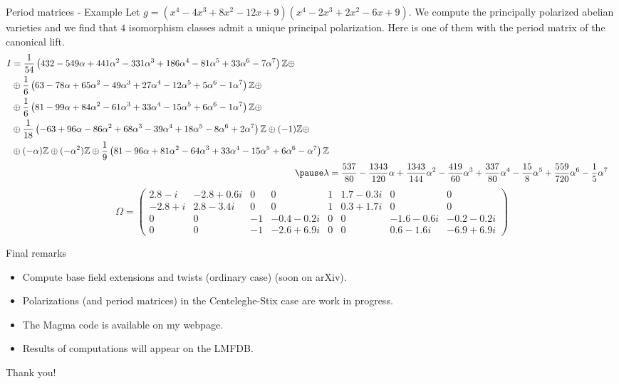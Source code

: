 \documentclass[usenames,dvipsnames]{beamer}
\def\Z{\mathbb{Z}}
\begin{document}
    
\begin{frame}{ Period matrices - Example }
   Let $g=(x^4 - 4x^3 + 8x^2 - 12x + 9)(x^4 - 2x^3 + 2x^2 - 6x + 9)$.
   \pause We compute the principally polarized abelian varieties and we find that $4$ isomorphism classes admit a unique principal polarization.
   \pause Here is one of them with the period matrix of the canonical lift.
 {\scriptsize\begin{align*}
    \begin{split}
       I & =  \dfrac{1}{54}\left(432-549\alpha+441\alpha^2-331\alpha^3+186\alpha^4-81\alpha^5+33\alpha^6-7\alpha^7\right)\Z\oplus\\
	   & \oplus\dfrac{1}{6}\left(63-78\alpha+65\alpha^2-49\alpha^3+27\alpha^4-12\alpha^5+5\alpha^6-1\alpha^7\right)\Z\oplus\\
           & \oplus\dfrac{1}{6}\left(81-99\alpha+84\alpha^2-61\alpha^3+33\alpha^4-15\alpha^5+6\alpha^6-1\alpha^7\right)\Z\oplus\\
           & \oplus\dfrac{1}{18}\left(-63+96\alpha-86\alpha^2+68\alpha^3-39\alpha^4+18\alpha^5-8\alpha^6+2\alpha^7\right)\Z\oplus(-1)\Z\oplus\\
	   & \oplus(-\alpha)\Z\oplus(-\alpha^2)\Z\oplus\dfrac{1}{9}\left(81-96\alpha+81\alpha^2-64\alpha^3+33\alpha^4-15\alpha^5+6\alpha^6-\alpha^7\right)\Z
    \end{split}\\
    \pause \lambda & = \dfrac{537}{80} -\dfrac{1343}{120}\alpha +\dfrac{1343}{144}\alpha^2 -\dfrac{419}{60}\alpha^3 +\dfrac{337}{80}\alpha^4 -\dfrac{15}{8}\alpha^5 +\dfrac{559}{720}\alpha^6 -\dfrac{1}{5}\alpha^7
    \end{align*}}
    \pause
    {\scriptsize\[
    \Omega =
    \begin{pmatrix}
      2.8 - i & -2.8 + 0.6i & 0 & 0 & 1 & 1.7 - 0.3i & 0 & 0 \\
      -2.8 + i & 2.8 - 3.4i & 0 & 0 & 1 & 0.3 + 1.7i & 0 & 0 \\
      0 & 0 & -1 & -0.4 - 0.2i & 0 & 0 & -1.6 - 0.6i & -0.2 - 0.2i\\
      0 & 0 & -1 & -2.6 + 6.9i & 0 & 0 & 0.6 - 1.6i & -6.9 + 6.9i
    \end{pmatrix}
    \]}
\end{frame}

\begin{frame}{ Final remarks }
    \begin{itemize}
     \item Compute base field extensions and twists (ordinary case) (soon on arXiv).
     \item Polarizations (and period matrices) in the Centeleghe-Stix case are work in progress.
     \item The Magma code is available on my webpage.
     \item Results of computations will appear on the LMFDB.
    \end{itemize}
\end{frame}

\begin{frame}{ }
\begin{center}
{\Large Thank you!}
\end{center}
\end{frame}
\end{document}
